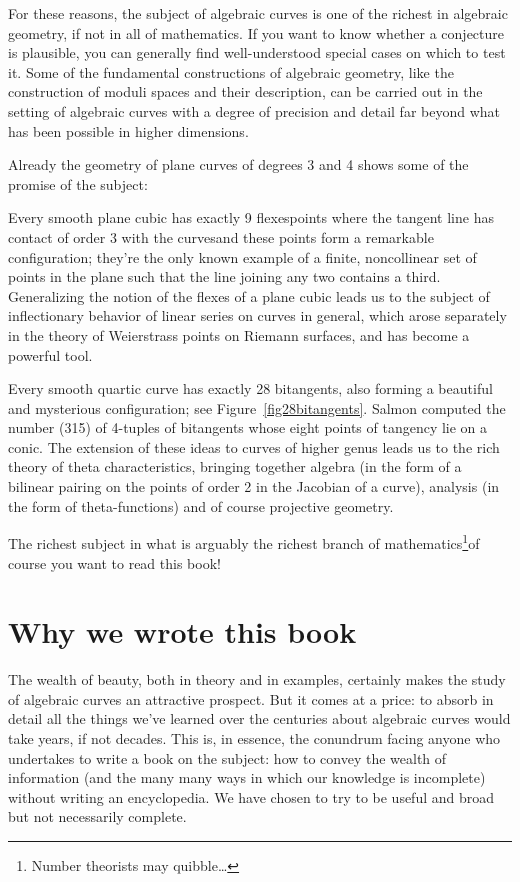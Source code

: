 For these reasons, the subject of algebraic curves is one of the richest in algebraic geometry, if not in all of mathematics. If you want to know whether a conjecture is plausible, you can generally find well-understood special cases on which to test it. Some of the fundamental constructions of algebraic geometry, like the construction of moduli spaces and their description, can be carried out in the setting of algebraic curves with a degree of precision and detail far beyond what has been possible in higher dimensions. 

Already the geometry of plane curves of degrees 3 and 4 shows some of the promise of the subject:

Every smooth plane cubic has exactly 9 flexes\emdash points where the
tangent line has contact of order 3 with the curves\emdash and these
points form a remarkable configuration; they're the only known example
of a finite, noncollinear set of points in the plane such that the line
joining any two contains a third. Generalizing the notion of the
flexes of a plane cubic leads us to the subject of inflectionary
behavior of linear series on curves in general, which arose separately
in the theory of Weierstrass points on Riemann surfaces, and  has
become a powerful tool.
%

Every smooth quartic curve has exactly 28 bitangents, also forming a beautiful and mysterious configuration; see 
%
%
%
Figure~\ref{fig28bitangents}. 
Salmon
\citeyear[p.\,197]{Salmon1852}
computed the number (315) of 4-tuples of bitangents whose eight points of tangency lie on a conic. The extension of these ideas to curves of higher genus leads us to the rich theory of theta characteristics, bringing together algebra (in the form of a bilinear pairing on the points of order 2 in the Jacobian of a curve), analysis (in the form of theta-functions) and of course projective geometry.

The richest subject in what is arguably the richest branch of
mathematics\footnote{Number theorists may quibble\dots}\emdash of
course you want to read this book!  

\section*{Why we wrote this book}

The wealth of beauty, both in theory and in examples, certainly makes the study of algebraic curves an attractive prospect. But it comes at a price: to absorb in detail all the things we've learned over the centuries about algebraic curves would take years, if not decades. This is, in essence, the conundrum facing anyone who undertakes to write a book on the subject: how to convey the wealth of information  (and the many many ways in which our knowledge is incomplete) without writing an encyclopedia. We have chosen to try to be useful and broad but not necessarily complete. 

